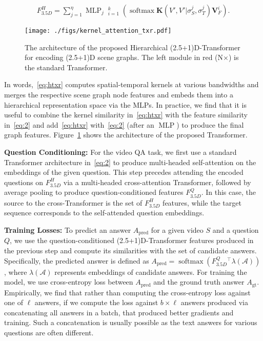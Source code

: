 \documentclass[letterpaper]{article} \usepackage{aaai22}  \usepackage{times}  \usepackage{helvet}  \usepackage{courier}  \usepackage[hyphens]{url}  \usepackage{graphicx} \urlstyle{rm} \def\UrlFont{\rm}  \usepackage{natbib}  \usepackage{caption} \DeclareCaptionStyle{ruled}{labelfont=normalfont,labelsep=colon,strut=off} \frenchspacing  \setlength{\pdfpagewidth}{8.5in}  \setlength{\pdfpageheight}{11in}  \usepackage{algorithm}
\newcommand{\ansset}{\mathcal{A}}
\newcommand{\V}{{S}}
\newcommand{\Q}{{Q}}
\newcommand{\Ap}{{A_{\text{pred}}}}
\newcommand{\Agt}{{A_{\text{gt}}}}
\newcommand{\fhd}{F^H_{3.5D}}
\newcommand{\fqd}{F^Q_{3.5D}}
\newcommand{\val}{\mathbf{V}}
\DeclareMathOperator*{\softmax}{softmax}
\DeclareMathOperator*{\concat}{||}
\DeclareMathOperator*{\MLP}{MLP}
\newcommand{\name}{(2.5+1)D\xspace}
\newcommand{\nameTxr}{(2.5+1)D-Transformer\xspace}
\newcommand{\nodes}{V}
\newcommand{\Kernel}{\mathbf{K}}
\begin{document}
\begin{align}
    \fhd\!=\!\sum_{j=1}^\eta\MLP_j\concat_{i=1}^k \left(\softmax \Kernel(\nodes'\!, \nodes'|\sigma^j_S,\!\sigma^j_T)\val^i_F\!\right).
    \label{eq:htxr}
\end{align}
\begin{figure}
    \centering
    \texttt{[image: ./figs/kernel\_attention\_txr.pdf]}
    \caption{The architecture of the proposed Hierarchical \nameTxr for encoding \name scene graphs. The left module in red (N$\times$) is the standard Transformer. }
    \label{fig:h3.5d_txr}
    \vspace*{-0.5cm}
\end{figure}
In words,~\eqref{eq:htxr} computes spatial-temporal kernels at various bandwidths and merges the respective scene graph node features and embeds them into a hierarchical representation space via the MLPs. In practice, we find that it is useful to combine the kernel similarity in~\eqref{eq:htxr} with the feature similarity in~\eqref{eq:2} and add~\eqref{eq:htxr} with~\eqref{eq:2} (after an $\MLP$) to produce the final graph features. Figure~\ref{fig:h3.5d_txr} shows the architecture of the proposed Transformer.

\noindent\textbf{Question Conditioning:}
For the video QA task, we first use a standard Transformer architecture in~\eqref{eq:2} to produce multi-headed self-attention on the embeddings of the given question. This step precedes attending the encoded questions on $\fhd$ via a multi-headed cross-attention Transformer, followed by average pooling to produce question-conditioned features $\fqd$. In this case, the source to the cross-Transformer is the set of $\fhd$ features, while the target sequence corresponds to the self-attended question embeddings. 

\noindent\textbf{Training Losses:}
To predict an answer $\Ap$ for a given video $\V$ and a question $\Q$, we use the question-conditioned \nameTxr features produced in the previous step and compute its similarities with the set of candidate answers. Specifically, the predicted answer is defined as $\Ap=\softmax({\fqd}{^\top}\lambda(\ansset))$, where $\lambda(\ansset)$ represents embeddings of candidate answers. For training the model, we use cross-entropy loss between $\Ap$ and the ground truth answer $\Agt$. Empirically, we find that rather than computing the cross-entropy loss against one of $\ell$ answers, if we compute the loss against $b\times \ell$ answers produced via concatenating all answers in a batch, that produced better gradients and training. Such a concatenation is usually possible as the text answers for various questions are often different.
\end{document}
